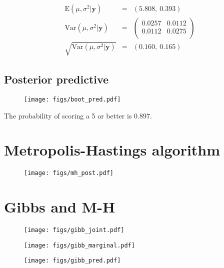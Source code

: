 \documentclass[12pt]{article}
\newcommand{\m}[1]{\mathbf{\bm{#1}}}
\begin{document}
\begin{eqnarray*}
\mathrm{E}(\mu,\sigma^2|\m{y}) &=& (5.808,~0.393) \\
\mathrm{Var}(\mu, \sigma^2|\m{y}) &=& \left(\begin{array}{ll} 0.0257 & 0.0112 \\ 0.0112 & 0.0275 \\ \end{array}\right) \\
\sqrt{\mathrm{Var}(\mu, \sigma^2|\m{y})} &=& (0.160,~0.165)
\end{eqnarray*}

\subsection{Posterior predictive}

\begin{figure}[H]
    \centering
    \texttt{[image: figs/boot\_pred.pdf]}
    \caption*{}
\end{figure}

\noindent The probability of scoring a 5 or better is $0.897$.

\section{Metropolis-Hastings algorithm}

\begin{figure}[H]
    \centering
    \texttt{[image: figs/mh\_post.pdf]}
    \caption*{}
\end{figure}

\section{Gibbs and M-H}

\begin{figure}[H]
    \centering
    \texttt{[image: figs/gibb\_joint.pdf]}
    \caption*{}
\end{figure}

\begin{figure}[H]
    \centering
    \texttt{[image: figs/gibb\_marginal.pdf]}
    \caption*{}
\end{figure}

\begin{figure}[H]
    \centering
    \texttt{[image: figs/gibb\_pred.pdf]}
    \caption*{}
\end{figure}
\end{document}
